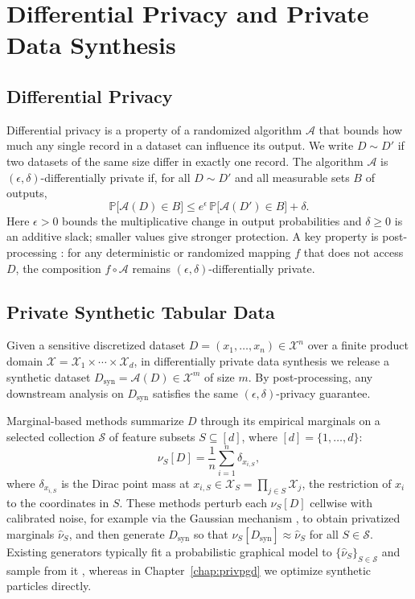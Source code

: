 \section{Differential Privacy and Private Data Synthesis}
\label{sec:bg-dp}

\subsection{Differential Privacy}

Differential privacy \citep{dp,dwork2014algorithmic} is a property of a randomized algorithm \(\mathcal{A}\) that bounds how much any single record in a dataset can influence its output. We write \(D \sim D'\) if two datasets of the same size differ in exactly one record. The algorithm \(\mathcal{A}\) is \((\epsilon, \delta)\)-differentially private if, for all \(D \sim D'\) and all measurable sets \(B\) of outputs,
\[
  \mathbb{P}\bigl[\mathcal{A}(D) \in B\bigr]
  \leq
  e^{\epsilon}\, \mathbb{P}\bigl[\mathcal{A}(D') \in B\bigr] + \delta.
\]
Here \(\epsilon > 0\) bounds the multiplicative change in output probabilities and \(\delta \geq 0\) is an additive slack; smaller values give stronger protection. A key property is post-processing \citep{dwork2014algorithmic}: for any deterministic or randomized mapping \(f\) that does not access \(D\), the composition \(f \circ \mathcal{A}\) remains \((\epsilon, \delta)\)-differentially private.

\subsection{Private Synthetic Tabular Data}

Given a sensitive discretized dataset \(D = (x_1, \dots, x_n) \in \mathcal{X}^n\) over a finite product domain \(\mathcal{X} = \mathcal{X}_1 \times \cdots \times \mathcal{X}_d\), in differentially private data synthesis we release a synthetic dataset \(D_{\mathrm{syn}} = \mathcal{A}(D) \in \mathcal{X}^m\) of size \(m\). By post-processing, any downstream analysis on \(D_{\mathrm{syn}}\) satisfies the same \((\epsilon, \delta)\)-privacy guarantee.

Marginal-based methods \citep{mst,aim} summarize \(D\) through its empirical marginals on a selected collection \(\mathcal{S}\) of feature subsets \(S \subseteq [d]\), where \([d] = \{1, \dots, d\}\):
\[
  \nu_S[D] = \frac{1}{n} \sum_{i=1}^n \delta_{x_{i,S}},
\]
where \(\delta_{x_{i,S}}\) is the Dirac point mass at \(x_{i,S} \in \mathcal{X}_S = \prod_{j \in S} \mathcal{X}_j\), the restriction of \(x_i\) to the coordinates in \(S\). These methods perturb each \(\nu_S[D]\) cellwise with calibrated noise, for example via the Gaussian mechanism \citep{dwork2014algorithmic}, to obtain privatized marginals \(\hat{\nu}_S\), and then generate \(D_{\mathrm{syn}}\) so that \(\nu_S[D_{\mathrm{syn}}] \approx \hat{\nu}_S\) for all \(S \in \mathcal{S}\). Existing generators typically fit a probabilistic graphical model to \(\{\hat{\nu}_S\}_{S \in \mathcal{S}}\) and sample from it \citep{mckenna2019graphical}, whereas in Chapter~\ref{chap:privpgd} we optimize synthetic particles directly.

